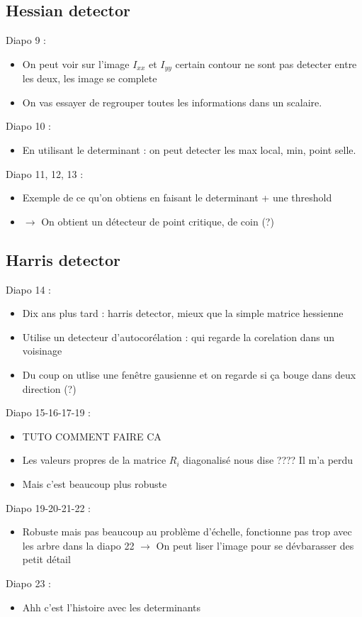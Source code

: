 \documentclass{article}
\theoremstyle{plain}%
\theoremstyle{definition}
\theoremstyle{remark}
\begin{document}
\subsection{Hessian detector}
Diapo 9 : 
\begin{itemize}
    \item On peut voir sur l'image $ I_{xx} $ et $ I_{yy} $ certain contour ne sont pas detecter entre les deux, les image se complete 
    \item On vas essayer de regrouper toutes les informations dans un scalaire.
\end{itemize}
Diapo 10 : 
\begin{itemize}
    \item En utilisant le determinant : on peut detecter les max local, min, point selle.
\end{itemize}
Diapo 11, 12, 13 : 
\begin{itemize}
    \item Exemple de ce qu'on obtiens en faisant le determinant + une threshold 
    \item $\rightarrow$ On obtient un détecteur de point critique, de coin (?)
\end{itemize}

\subsection{Harris detector}
Diapo 14 : 
\begin{itemize}
    \item Dix ans plus tard : harris detector, mieux que la simple matrice hessienne
    \item Utilise un detecteur d'autocorélation : qui regarde la corelation dans un voisinage
    \item Du coup on utlise une fenêtre gausienne et on regarde si ça bouge dans deux direction (?)
\end{itemize}
Diapo 15-16-17-19 : 
\begin{itemize}
    \item TUTO COMMENT FAIRE CA 
    \item Les valeurs propres de la matrice $ R_i $ diagonalisé nous dise ???? Il m'a perdu 
    \item Mais c'est beaucoup plus robuste
\end{itemize}
Diapo 19-20-21-22 : 
\begin{itemize}
    \item Robuste mais pas beaucoup au problème d'échelle, fonctionne pas trop avec les arbre dans la diapo 22 $\rightarrow$ On peut liser l'image pour se dévbarasser des petit détail
\end{itemize}
Diapo 23 : 
\begin{itemize}
    \item Ahh c'est l'histoire avec les determinants
\end{itemize}
\end{document}
